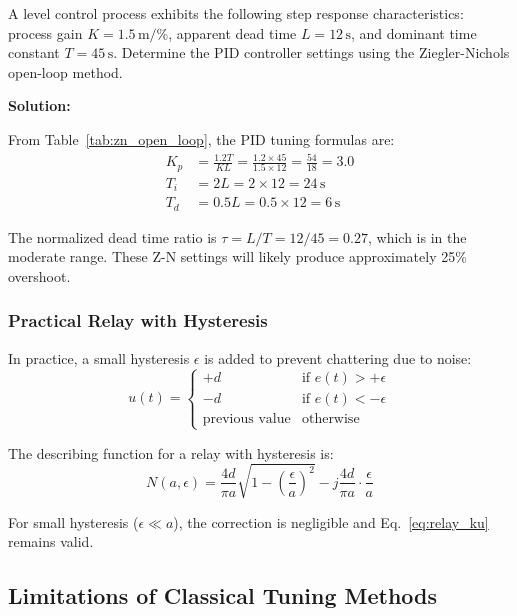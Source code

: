 \begin{examplebox}
A level control process exhibits the following step response characteristics: process gain $K = 1.5\,\text{m}/\%$, apparent dead time $L = 12\,\text{s}$, and dominant time constant $T = 45\,\text{s}$. Determine the PID controller settings using the Ziegler-Nichols open-loop method.

\textbf{Solution:}

From Table~\ref{tab:zn_open_loop}, the PID tuning formulas are:
\begin{align*}
K_p &= \frac{1.2T}{KL} = \frac{1.2 \times 45}{1.5 \times 12} = \frac{54}{18} = 3.0 \\
T_i &= 2L = 2 \times 12 = 24\,\text{s} \\
T_d &= 0.5L = 0.5 \times 12 = 6\,\text{s}
\end{align*}

The normalized dead time ratio is $\tau = L/T = 12/45 = 0.27$, which is in the moderate range. These Z-N settings will likely produce approximately 25\% overshoot.
\end{examplebox}

\subsubsection{Practical Relay with Hysteresis}

In practice, a small hysteresis $\epsilon$ is added to prevent chattering due to noise:
\begin{equation}
    u(t) = \begin{cases}
        +d & \text{if } e(t) > +\epsilon \\
        -d & \text{if } e(t) < -\epsilon \\
        \text{previous value} & \text{otherwise}
    \end{cases}
\end{equation}

The describing function for a relay with hysteresis is:
\begin{equation}
    N(a,\epsilon) = \frac{4d}{\pi a}\sqrt{1 - \left(\frac{\epsilon}{a}\right)^2} - j\frac{4d}{\pi a}\cdot\frac{\epsilon}{a}
\end{equation}

For small hysteresis ($\epsilon \ll a$), the correction is negligible and Eq.~\eqref{eq:relay_ku} remains valid.

\subsection{Limitations of Classical Tuning Methods}

